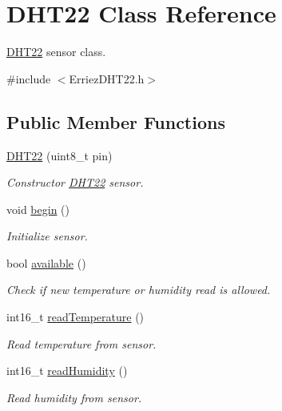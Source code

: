 \hypertarget{class_d_h_t22}{}\section{D\+H\+T22 Class Reference}
\label{class_d_h_t22}


\hyperlink{class_d_h_t22}{D\+H\+T22} sensor class.  




{\ttfamily \#include $<$Erriez\+D\+H\+T22.\+h$>$}

\subsection*{Public Member Functions}
\begin{DoxyCompactItemize}
\item 
\hyperlink{class_d_h_t22_a6983635331e939d679888b4a936e0f53}{D\+H\+T22} (uint8\+\_\+t pin)
\begin{DoxyCompactList}\small\item\em Constructor \hyperlink{class_d_h_t22}{D\+H\+T22} sensor. \end{DoxyCompactList}\item 
void \hyperlink{class_d_h_t22_a1391c4ada47bb35408a45d349747be5c}{begin} ()
\begin{DoxyCompactList}\small\item\em Initialize sensor. \end{DoxyCompactList}\item 
bool \hyperlink{class_d_h_t22_a70b4c57d73f985e715bd523f15ccae25}{available} ()
\begin{DoxyCompactList}\small\item\em Check if new temperature or humidity read is allowed. \end{DoxyCompactList}\item 
int16\+\_\+t \hyperlink{class_d_h_t22_aeed4f98e419ffb07d3e4c09ebc10162c}{read\+Temperature} ()
\begin{DoxyCompactList}\small\item\em Read temperature from sensor. \end{DoxyCompactList}\item 
int16\+\_\+t \hyperlink{class_d_h_t22_a4ff2d9fac4b8ecf1d72f71bb861c8dcf}{read\+Humidity} ()
\begin{DoxyCompactList}\small\item\em Read humidity from sensor. \end{DoxyCompactList}\end{DoxyCompactItemize}


